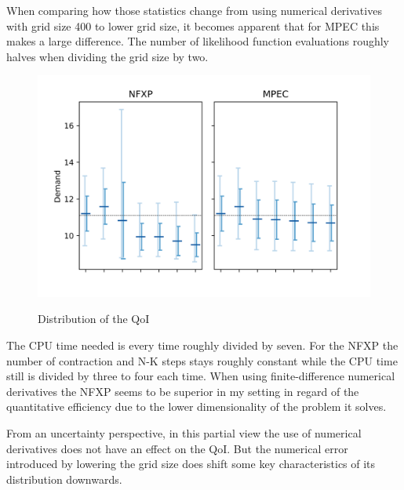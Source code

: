 When comparing how those statistics change from using numerical derivatives with grid size 400 to lower grid size, it becomes apparent that for MPEC this makes a large difference. The number of likelihood function evaluations roughly halves when dividing the grid size by two.

\begin{figure}[!b]
	\caption{Distribution of the QoI}
	\vspace*{-4mm}
	\centering
	\includegraphics[scale=0.9]{../figures/figure_9.png}
	\label{figure9}
\end{figure}

The CPU time needed is every time roughly divided by seven. For the NFXP the number of contraction and N-K steps stays roughly constant while the CPU time still is divided by three to four each time. When using finite-difference numerical derivatives the NFXP seems to be superior in my setting in regard of the quantitative efficiency due to the lower dimensionality of the problem it solves.

From an uncertainty perspective, in this partial view the use of numerical derivatives does not have an effect on the QoI. But the numerical error introduced by lowering the grid size does shift some key characteristics of its distribution downwards.






